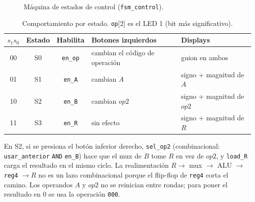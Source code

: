 \documentclass[11pt,a4paper]{article}
\newcommand{\bit}[1]{\texttt{#1}}
\newcommand{\sig}[1]{\texttt{#1}}
\begin{document}
\begin{figure}[H]
\centering
{}
\caption{Máquina de estados de control (\sig{fsm\_control}).}
\label{fig:fsm}
\end{figure}

\begin{table}[H]
\centering
\small
\begin{tabular}{@{}cccp{3.6cm}p{3.6cm}@{}}
\toprule
$s_1s_0$ & \textbf{Estado} & \textbf{Habilita} & \textbf{Botones izquierdos} & \textbf{Displays} \\
\midrule
00 & S0 & \sig{en\_op} & cambian el código de operación & guion en ambos \\
01 & S1 & \sig{en\_A}  & cambian $A$ & signo + magnitud de $A$ \\
10 & S2 & \sig{en\_B}  & cambian $op2$ & signo + magnitud de $op2$ \\
11 & S3 & \sig{en\_R}  & sin efecto & signo + magnitud de $R$ \\
\bottomrule
\end{tabular}
\caption{Comportamiento por estado. \sig{op}[2] es el LED 1 (bit más significativo).}
\end{table}

En S2, si se presiona el botón inferior derecho, \sig{sel\_op2} (combinacional: \sig{usar\_anterior} \verb|AND| \sig{en\_B}) hace que el mux de $B$ tome $R$ en vez de $op2$, y \sig{load\_R} carga el resultado en el mismo ciclo. La realimentación $R\to$ mux $\to$ ALU $\to$ \sig{reg4} $\to R$ no es un lazo combinacional porque el flip-flop de \sig{reg4} corta el camino. Los operandos $A$ y $op2$ no se reinician entre rondas; para poner el resultado en 0 se usa la operación \bit{000}.
\end{document}
